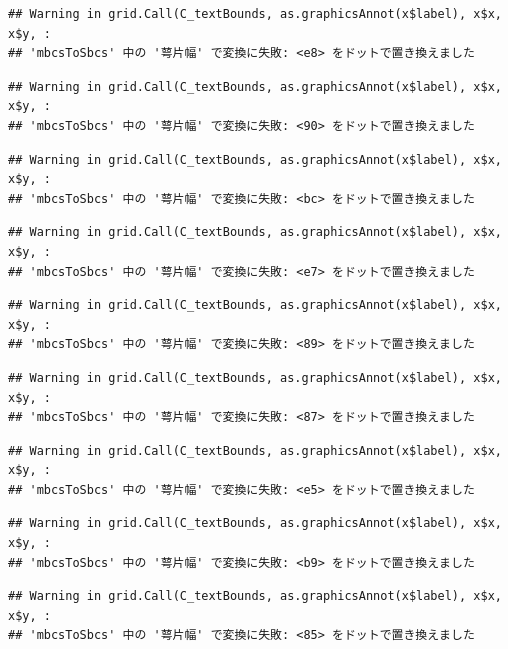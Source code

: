 \documentclass[
]{book}
\begin{document}
\begin{verbatim}
## Warning in grid.Call(C_textBounds, as.graphicsAnnot(x$label), x$x, x$y, :
## 'mbcsToSbcs' 中の '萼片幅' で変換に失敗: <e8> をドットで置き換えました
\end{verbatim}

\begin{verbatim}
## Warning in grid.Call(C_textBounds, as.graphicsAnnot(x$label), x$x, x$y, :
## 'mbcsToSbcs' 中の '萼片幅' で変換に失敗: <90> をドットで置き換えました
\end{verbatim}

\begin{verbatim}
## Warning in grid.Call(C_textBounds, as.graphicsAnnot(x$label), x$x, x$y, :
## 'mbcsToSbcs' 中の '萼片幅' で変換に失敗: <bc> をドットで置き換えました
\end{verbatim}

\begin{verbatim}
## Warning in grid.Call(C_textBounds, as.graphicsAnnot(x$label), x$x, x$y, :
## 'mbcsToSbcs' 中の '萼片幅' で変換に失敗: <e7> をドットで置き換えました
\end{verbatim}

\begin{verbatim}
## Warning in grid.Call(C_textBounds, as.graphicsAnnot(x$label), x$x, x$y, :
## 'mbcsToSbcs' 中の '萼片幅' で変換に失敗: <89> をドットで置き換えました
\end{verbatim}

\begin{verbatim}
## Warning in grid.Call(C_textBounds, as.graphicsAnnot(x$label), x$x, x$y, :
## 'mbcsToSbcs' 中の '萼片幅' で変換に失敗: <87> をドットで置き換えました
\end{verbatim}

\begin{verbatim}
## Warning in grid.Call(C_textBounds, as.graphicsAnnot(x$label), x$x, x$y, :
## 'mbcsToSbcs' 中の '萼片幅' で変換に失敗: <e5> をドットで置き換えました
\end{verbatim}

\begin{verbatim}
## Warning in grid.Call(C_textBounds, as.graphicsAnnot(x$label), x$x, x$y, :
## 'mbcsToSbcs' 中の '萼片幅' で変換に失敗: <b9> をドットで置き換えました
\end{verbatim}

\begin{verbatim}
## Warning in grid.Call(C_textBounds, as.graphicsAnnot(x$label), x$x, x$y, :
## 'mbcsToSbcs' 中の '萼片幅' で変換に失敗: <85> をドットで置き換えました
\end{verbatim}
\end{document}
